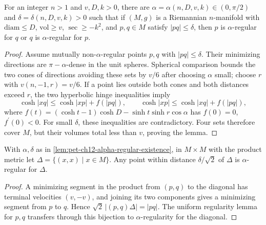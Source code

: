 \begin{lemma}
  \label{lem:pet-ch12-alpha-regular-existence}
  For an integer $n>1$ and $v,D,k>0$, there are
  $\alpha=\alpha(n,D,v,k)\in(0,\pi/2)$ and $\delta=\delta(n,D,v,k)>0$ such that
  if $(M,g)$ is a Riemannian $n$-manifold with $\mathrm{diam}\le D$,
  $\mathrm{vol}\ge v$, $\sec\ge-k^2$, and $p,q\in M$ satisfy $|pq|\le\delta$,
  then $p$ is $\alpha$-regular for $q$ or $q$ is $\alpha$-regular for $p$.
\end{lemma}
\begin{proof}
  \sketch
  Assume mutually non-\(\alpha\)-regular points \(p,q\) with \( |pq|\le\delta\).
  Their minimizing directions are \(\pi-\alpha\)-dense in the unit spheres.
  Spherical comparison bounds the two cones of directions avoiding these sets
  by \(v/6\) after choosing \(\alpha\) small; choose \(r\) with
  \(v(n,-1,r)=v/6\). If a point lies outside both cones and both distances
  exceed \(r\), the two hyperbolic hinge inequalities imply
  \[\cosh|xq|\le\cosh|xp|+f(|pq|),\qquad
    \cosh|xp|\le\cosh|xq|+f(|pq|),\]
  where \(f(t)=(\cosh t-1)\cosh D-\sinh t\sinh r\cos\alpha\) has
  \(f(0)=0\), \(f^{\prime}(0)<0\). For small \(\delta\), these inequalities are
  contradictory. Four sets therefore cover \(M\), but their volumes total less
  than \(v\), proving the lemma.
\end{proof}

\begin{corollary}
  \label{cor:pet-ch12-diagonal-alpha-regular}
  With $\alpha,\delta$ as in \cref{lem:pet-ch12-alpha-regular-existence}, in
  $M\times M$ with the product metric let $\Delta=\{(x,x)\mid x\in M\}$. Any
  point within distance $\delta/\sqrt2$ of $\Delta$ is $\alpha$-regular for
  $\Delta$.
\end{corollary}
\begin{proof}
  \sketch
  A minimizing segment in the product from \((p,q)\) to the diagonal has
  terminal velocities \((v,-v)\), and joining its two components gives a
  minimizing segment from \(p\) to \(q\). Hence \(\sqrt2\,|(p,q)\Delta|=|pq|\).
  The uniform regularity lemma for \(p,q\) transfers through this bijection to
  \(\alpha\)-regularity for the diagonal.
\end{proof}

